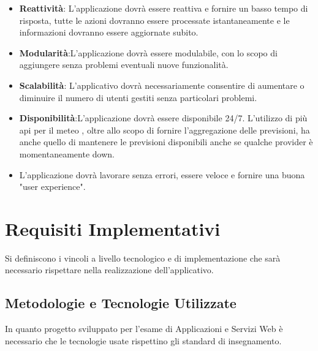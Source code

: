             \begin{itemize}
                \item \textbf{Reattività}: L'applicazione dovrà essere reattiva e fornire un basso tempo di risposta, tutte le azioni dovranno essere processate istantaneamente e le informazioni dovranno essere aggiornate subito.
                \item \textbf{Modularità}:L'applicazione dovrà essere modulabile, con lo scopo di aggiungere senza problemi eventuali nuove funzionalità.
                \item \textbf{Scalabilità}: L'applicativo dovrà necessariamente consentire di aumentare o diminuire il numero di utenti gestiti senza particolari problemi. 
                \item \textbf{Disponibilità}:L'applicazione dovrà essere disponibile 24/7. L'utilizzo di più api per il meteo , oltre allo scopo di fornire l'aggregazione delle previsioni, ha anche quello di mantenere le previsioni disponibili anche se qualche provider è momentaneamente down.
                \item L'applicazione dovrà lavorare senza errori, essere veloce e fornire una buona "user experience".
            \end{itemize}
        

	\section{Requisiti Implementativi}
	Si definiscono i vincoli a livello tecnologico e di implementazione che sarà necessario rispettare nella realizzazione dell'applicativo.
	
	\subsection{Metodologie e Tecnologie Utilizzate}
	In quanto progetto sviluppato per l'esame di Applicazioni e Servizi Web è necessario che le tecnologie usate rispettino gli standard di insegnamento. 
	
